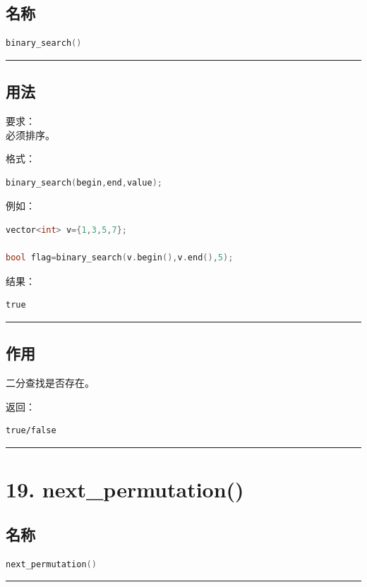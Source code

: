 \documentclass[9pt,twocolumn]{extarticle}
\begin{document}
\subsection{名称}
\begin{lstlisting}[language=C++]
binary_search()
\end{lstlisting}

\noindent\rule{\linewidth}{0.4pt}

\subsection{用法}
要求：\\
必须排序。

格式：
\begin{lstlisting}[language=C++]
binary_search(begin,end,value);
\end{lstlisting}
例如：
\begin{lstlisting}[language=C++]
vector<int> v={1,3,5,7};

bool flag=binary_search(v.begin(),v.end(),5);
\end{lstlisting}
结果：
\begin{lstlisting}
true
\end{lstlisting}

\noindent\rule{\linewidth}{0.4pt}

\subsection{作用}
二分查找是否存在。

返回：
\begin{lstlisting}
true/false
\end{lstlisting}

\noindent\rule{\linewidth}{0.4pt}

\section{19. next\_permutation()}

\subsection{名称}
\begin{lstlisting}[language=C++]
next_permutation()
\end{lstlisting}

\noindent\rule{\linewidth}{0.4pt}
\end{document}
